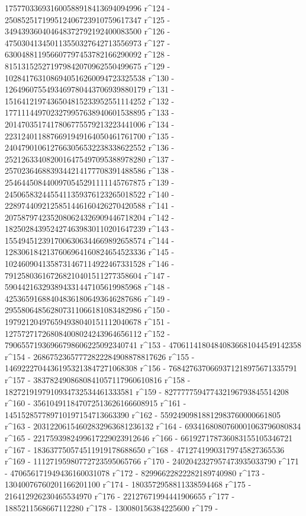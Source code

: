        175770336931600588918413694094996 r^124 - 
       250852517199512406723910759617347 r^125 - 
       349439360404648372792192400083500 r^126 - 
       475030413450113550327642713556973 r^127 - 
       630048811956607797453782166290092 r^128 - 
       815131525271979842070962550499675 r^129 - 
       1028417631086940516260094723325538 r^130 - 
       1264960755493469780443706939880179 r^131 - 
       1516412197436504815233952551114252 r^132 - 
       1771114497023279957638940601538895 r^133 - 
       2014703517417806775579213223441006 r^134 - 
       2231240118876691949164050461761700 r^135 - 
       2404790106127663056532238338622552 r^136 - 
       2521263340820016475497095388978280 r^137 - 
       2570236468839344214177708391488586 r^138 - 
       2546445084400970545291111145767875 r^139 - 
       2450658324455411359376123265018522 r^140 - 
       2289744092125851446160426270420588 r^141 - 
       2075879742352080624326909446718204 r^142 - 
       1825028439524274639830110201647239 r^143 - 
       1554945123917006306344669892658574 r^144 - 
       1283061842137606964160824654523336 r^145 - 
       1024609041358731467114922467331528 r^146 - 
       791258036167268210401511277358604 r^147 - 
       590442163293894331447105619985968 r^148 - 
       425365916884048361806493646287686 r^149 - 
       295580648562807311066181083482986 r^150 - 
       197921204976594938040151112040678 r^151 - 
       127572717268084008024243964656112 r^152 - 
       79065571936966798606225092340741 r^153 - 
       47061141804840836681044549142358 r^154 - 
       26867523657772822284908878817626 r^155 - 
       14692227044361953213847271068308 r^156 - 
       7684276370669371218975671335791 r^157 - 
       3837824908680841057117960610816 r^158 - 
       1827219197910934732534461333581 r^159 - 
       827777759477432196793845514208 r^160 - 
       356104911847072513626166608915 r^161 - 
       145152857789710197154713663390 r^162 - 
       55924909818812983760000661805 r^163 - 
       20312206154602832963681236132 r^164 - 
       6934168080760001063796080834 r^165 - 
       2217593982499617229023912646 r^166 - 
       661927178736083155105346721 r^167 - 
       183637750574511919178688650 r^168 - 
       47127419903179745827365536 r^169 - 
       11127195980772723595065766 r^170 - 
       2402042327957473935033790 r^171 - 
       470656171949436160031078 r^172 - 
       82996622822282189740980 r^173 - 
       13040076760201166201100 r^174 - 1803572958811338594468 r^175 - 
       216412926230465534970 r^176 - 22127671994441906655 r^177 - 
       1885211568667112280 r^178 - 130080156384225600 r^179 - 
